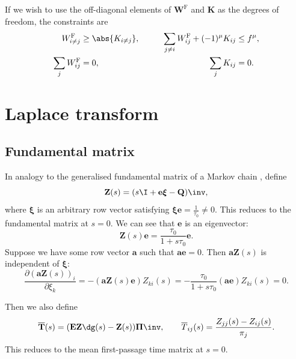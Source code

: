 \documentclass[12pt]{article}
\newcommand{\onev}{\mathbf{e}}
\newcommand{\onem}{\mathbf{E}}
\newcommand{\MMm}{Q}
\newcommand{\MM}{\mathbf{\MMm}}
\newcommand{\eqm}{\pi}
\newcommand{\Eqm}{\Pi}
\newcommand{\Eq}{\boldsymbol{\Eqm}}
\newcommand{\fptm}{T}
\newcommand{\fpt}{\mathbf{\fptm}}
\newcommand{\fptbm}{\overline{\fptm}}
\newcommand{\fptb}{\overline{\fpt}}
\newcommand{\fundm}{Z}
\newcommand{\fund}{\mathbf{\fundm}}
\newcommand{\arowm}{\xi}
\newcommand{\arow}{\boldsymbol{\arowm}}
\newcommand{\Wm}{W}
\newcommand{\W}{\mathbf{\Wm}}
\newcommand{\encm}{K}
\newcommand{\enc}{\mathbf{\encm}}
\newcommand{\frgm}{\Wm^{\mathrm{F}}}
\newcommand{\frg}{\W^{\mathrm{F}}}
\renewcommand{\pdiff}[2]{\frac{\partial #1}{\partial #2}}
\begin{document}
If we wish to use the off-diagonal elements of \(\frg\) and \(\enc\) as the degrees of freedom, the constraints are
%
\begin{equation}\label{eq:constrfe}
\begin{aligned}
  \frgm_{i \neq j}   &\geq \abs{ \encm_{i \neq j} }, &\qquad
  \sum_{j\neq i}\frgm_{ij} + (-1)^\mu \encm_{ij}  &\leq f^\mu, \\
  \sum_j \frgm_{ij} &=0, &
  \sum_j \encm_{ij} &=0.
\end{aligned}
\end{equation}
%



\section{Laplace transform}\label{sec:laplace}


\subsection{Fundamental matrix \etc}\label{sec:lfund}

In analogy to the generalised fundamental matrix of a Markov chain \cite{Kemeny1981fund}, define
%
\begin{equation}\label{eq:lfund}
  \fund(s) = (s \I + \onev \arow -\MM)\inv,
\end{equation}
%
where \(\arow\) is an arbitrary row vector satisfying \(\arow \onev = \frac{1}{\tau_0} \neq 0\).
This reduces to the fundamental matrix at \(s=0\).
We can see that \(\onev\) is an eigenvector:
%
\begin{equation}\label{eq:lfundrowsum}
  \fund(s)\onev = \frac{\tau_0}{1+s\tau_0}\onev.
\end{equation}
%
Suppose we have some row vector \(\mathbf{a}\) such that \(\mathbf{a}\onev=0\).
Then \(\mathbf{a}\fund(s)\) is independent of \(\arow\):
%
\begin{equation}\label{eq:alfund}
  \pdiff{(\mathbf{a}\fund(s))_i}{\arowm_k} = -(\mathbf{a}\fund(s)\onev) \fundm_{ki}(s)
      = -\frac{\tau_0}{1+s\tau_0} (\mathbf{a}\onev) \fundm_{ki}(s) = 0.
\end{equation}
%

Then we also define
%
\begin{equation}\label{eq:lfptb}
  \fptb(s) = (\onem \fund\dg(s)-\fund(s))\Eq\inv,
  \qquad
  \fptbm_{ij}(s) = \frac{\fundm_{jj}(s)-\fundm_{ij}(s)}{\eqm_j}.
\end{equation}
%
This reduces to the mean first-passage time matrix at \(s=0\). 
\end{document}
